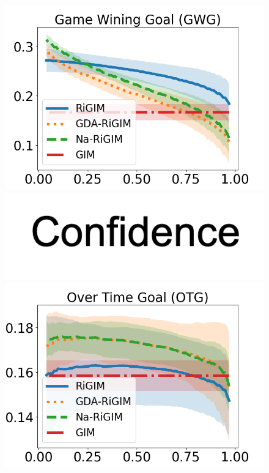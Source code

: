 \documentclass{article}
\begin{document}
\begin{figure}[htbp]
\begin{minipage}{0.16\textwidth}
    \includegraphics[scale=0.17]{figures/risk_curve_GWG_shadow.png}\par
    \vspace{-0.05in}
    \includegraphics[scale=0.15]{figures/confidence_x_label.png}
    \end{minipage}
    \begin{minipage}{0.16\textwidth}
    \centering
    \includegraphics[scale=0.17]{figures/risk_curve_OTG_shadow.png}\par

\end{minipage}
\end{figure}
\end{document}
